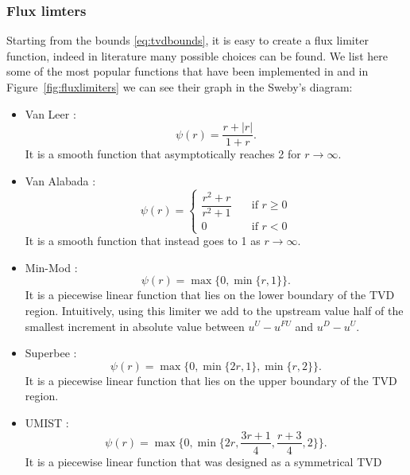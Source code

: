\subsubsection{Flux limters}
Starting from the bounds \eqref{eq:tvdbounds}, it is easy to create a 
flux limiter function, indeed in literature many possible choices can be 
found. 
We list here some of the most popular functions that have been implemented in 
\DUMUX and in Figure~\ref{fig:fluxlimiters} we can see their graph in the 
Sweby's diagram:
\begin{itemize}
	\item Van Leer \cite{tvd:vanleer}:
	\begin{equation} \label{eq:vl}
	\psi(r) = \frac{r+|r|}{1+r}.
	\end{equation}
	It is a smooth function that asymptotically reaches 2 for $r \rightarrow 
	\infty$.
%
	\item Van Alabada \cite{tvd:vanalabada}:
	\begin{equation} \label{eq:vanalabada}
	\psi(r)=
	\begin{cases}
	\dfrac{r^2+r}{r^2+1} \quad &\text{if $r\geq 0$}\\[2ex]
	0 \quad &\text{if $r<0$}
	\end{cases}
	\end{equation}
	It is a smooth function that instead goes to 1 as $r \rightarrow \infty$.
%
	\item Min-Mod \cite{tvd:roe}:
	\begin{equation} \label{eq:minmod}
	\psi(r) = \max \{0, \min \{ r,1\} \}.
	\end{equation}
	It is a piecewise linear function that lies on the lower boundary of the 
	TVD region. Intuitively, using this limiter we add to the upstream value  
	half of	the smallest increment in absolute value between $u^U-u^{FU}$ and 
	$u^D - u^U$.
%
	\item Superbee \cite{tvd:roe}:
	\begin{equation} \label{eq:superbee}
	\psi(r)=\max \{0, \min \{ 2r, 1\}, \min \{ r, 2\} \}.
	\end{equation}
	It is a piecewise linear function that lies on the upper boundary of the 
	TVD region.
%
	\item UMIST \cite{tvd:lien}:
	\begin{equation} \label{eq:umist}
	\psi(r)=\max \bigg\{0, \min \bigg\{ 2r, \frac{3r+1}{4},\frac{r+3}{4}, 
	2\bigg\} \bigg\}.
	\end{equation}
	It is a piecewise linear function that was designed as a symmetrical TVD 

\end{itemize}

